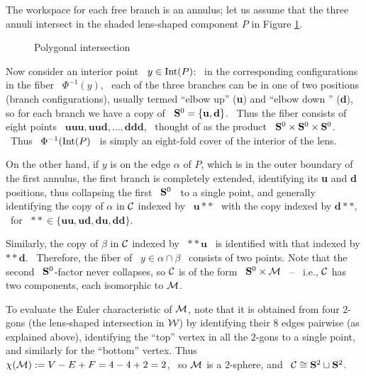 The workspace for each free branch is an annulus; let us assume
that the three annuli intersect in the shaded lens-shaped
component $P$ in Figure \ref{fig:annulus intersection}.

\begin{figure}[h]
\begin{center}
\epsfysize=5cm \leavevmode {}
\caption{Polygonal intersection} \label{fig:annulus intersection}
\end{center}
\end{figure}

Now consider an interior point \ $y\in\operatorname{Int}(P)$: \ in the
corresponding configurations in the fiber \ $\Phi^{-1}(y)$, \ each
of the three branches can be in one of two positions (branch
configurations), usually termed ``elbow up'' (\textbf{u}) and
``elbow down '' (\textbf{d}), so for each branch we have a copy of
\ ${\mathbf{S}^{0}}=\{\mathbf{u},\mathbf{d}\}$. \ Thus the fiber consists of
eight points \ $\mathbf{uuu},\mathbf{uud},\dotsc,\mathbf{ddd}$, \
thought of as the product \ ${\mathbf{S}^{0}}\times{\mathbf{S}^{0}}\times{\mathbf{S}^{0}}$. \
Thus \ $\Phi^{-1}(\operatorname{Int}(P)$ \ is simply an eight-fold cover of the
interior of the lens.

On the other hand, if $y$ is on the edge $\alpha$ of $P$, which is
in the outer boundary of the first annulus, the first branch is
completely extended, identifying its \textbf{u} and \textbf{d}
positions, thus collapsing the first \ ${\mathbf{S}^{0}}$ \ to a single
point, and generally identifying the copy of $\alpha$ in $\mathcal{C}$
indexed by \ $\mathbf{u\ast\ast}$ \ with the copy indexed by
$\mathbf{d\ast\ast}$, \ for \
$\mathbf{\ast\ast}\in\{\mathbf{uu},\mathbf{ud},\mathbf{du},\mathbf{dd}\}$.

Similarly, the copy of $\beta$ in $\mathcal{C}$ indexed by \
$\mathbf{\ast\ast u}$ \ is identified with that indexed by
$\mathbf{\ast\ast d}$. \ Therefore, the fiber of \
$y\in\alpha\cap\beta$ \ consists of two points. Note that the
second \ ${\mathbf{S}^{0}}$-factor never collapses, so $\mathcal{C}$ is of the form \
${\mathbf{S}^{0}}\times\mathcal{M}$ \ -- \ i.e., $\mathcal{C}$ has two components, each
isomorphic to $\mathcal{M}$.

To evaluate the Euler characteristic of $\mathcal{M}$, note that it is
obtained from four $2$-gons (the lens-shaped intersection in $\mathcal{W}$)
by identifying their $8$ edges pairwise (as explained above),
identifying the ``top'' vertex in all the $2$-gons to a single
point, and similarly for the ``bottom'' vertex. Thus \
$\chi(\mathcal{M}):=V-E+F=4-4+2=2$, \ so $\mathcal{M}$ is a $2$-sphere, and \
$\mathcal{C}\cong{\mathbf{S}^{2}}\sqcup{\mathbf{S}^{2}}$.

